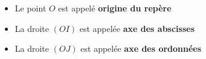 \begin{itemize}
\item Le point $O$ est appelé \textbf{origine du repère}
\item La droite $\left(OI\right)$ est appelée \textbf{axe des abscisses}
\item La droite $\left(OJ\right)$ est appelée \textbf{axe des ordonnées}
\end{itemize}



